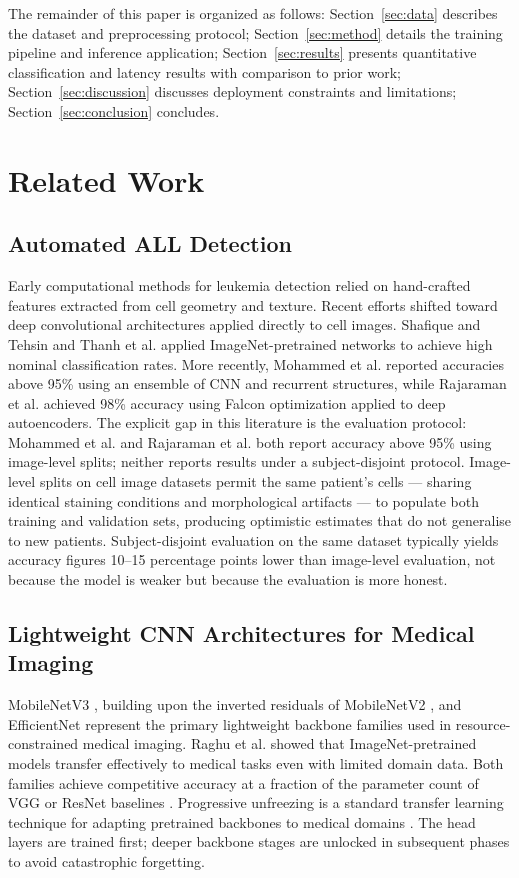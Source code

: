 \documentclass[journal,twoside,web]{ieeecolor}
\begin{document}
The remainder of this paper is organized as follows: Section~\ref{sec:data} describes the dataset and preprocessing protocol; Section~\ref{sec:method} details the training pipeline and inference application; Section~\ref{sec:results} presents quantitative classification and latency results with comparison to prior work; Section~\ref{sec:discussion} discusses deployment constraints and limitations; Section~\ref{sec:conclusion} concludes.

\section{Related Work}
\label{sec:related}

\subsection{Automated ALL Detection}
Early computational methods for leukemia detection relied on hand-crafted features extracted from cell geometry and texture. Recent efforts shifted toward deep convolutional architectures applied directly to cell images. Shafique and Tehsin \cite{b3} and Thanh et al. \cite{b4} applied ImageNet-pretrained networks to achieve high nominal classification rates. More recently, Mohammed et al. \cite{b7} reported accuracies above 95\% using an ensemble of CNN and recurrent structures, while Rajaraman et al. \cite{b10} achieved 98\% accuracy using Falcon optimization applied to deep autoencoders. The explicit gap in this literature is the evaluation protocol: Mohammed et al. \cite{b7} and Rajaraman et al. \cite{b10} both report accuracy above 95\% using image-level splits; neither reports results under a subject-disjoint protocol. Image-level splits on cell image datasets permit the same patient's cells --- sharing identical staining conditions and morphological artifacts --- to populate both training and validation sets, producing optimistic estimates that do not generalise to new patients. Subject-disjoint evaluation on the same dataset typically yields accuracy figures 10--15 percentage points lower than image-level evaluation, not because the model is weaker but because the evaluation is more honest.

\subsection{Lightweight CNN Architectures for Medical Imaging}
MobileNetV3 \cite{b_howard2019}, building upon the inverted residuals of MobileNetV2 \cite{b_mobilenet_v2}, and EfficientNet \cite{b12} represent the primary lightweight backbone families used in resource-constrained medical imaging. Raghu et al. \cite{b_raghu2019} showed that ImageNet-pretrained models transfer effectively to medical tasks even with limited domain data. Both families achieve competitive accuracy at a fraction of the parameter count of VGG or ResNet baselines \cite{b2}. Progressive unfreezing is a standard transfer learning technique for adapting pretrained backbones to medical domains \cite{b1}. The head layers are trained first; deeper backbone stages are unlocked in subsequent phases to avoid catastrophic forgetting. 
\end{document}
